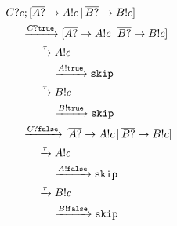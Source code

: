 \documentclass[compress]{beamer}
\begin{document}
\begin{frame}
    \small
    \begin{align*}
        & C?c; [\overline{A?} \rightarrow A!c \, | \, \overline{B?} \rightarrow B!c] \\
        & \hspace{0.5cm} \xrightarrow{C?\mathtt{true}} [\overline{A?} \rightarrow A!c \, | \, \overline{B?} \rightarrow B!c] \\
        & \hspace{1.0cm} \xrightarrow{\tau} A!c \\
        & \hspace{1.5cm} \xrightarrow{A!\mathtt{true}} \mathtt{skip} \\
        & \hspace{1.0cm} \xrightarrow{\tau} B!c \\
        & \hspace{1.5cm} \xrightarrow{B!\mathtt{true}} \mathtt{skip} \\
        & \hspace{0.5cm} \xrightarrow{C?\mathtt{false}} [\overline{A?} \rightarrow A!c \, | \, \overline{B?} \rightarrow B!c] \\
        & \hspace{1.0cm} \xrightarrow{\tau} A!c \\
        & \hspace{1.5cm} \xrightarrow{A!\mathtt{false}} \mathtt{skip} \\
        & \hspace{1.0cm} \xrightarrow{\tau} B!c \\
        & \hspace{1.5cm} \xrightarrow{B!\mathtt{false}} \mathtt{skip}
    \end{align*}
\end{frame}
\end{document}
